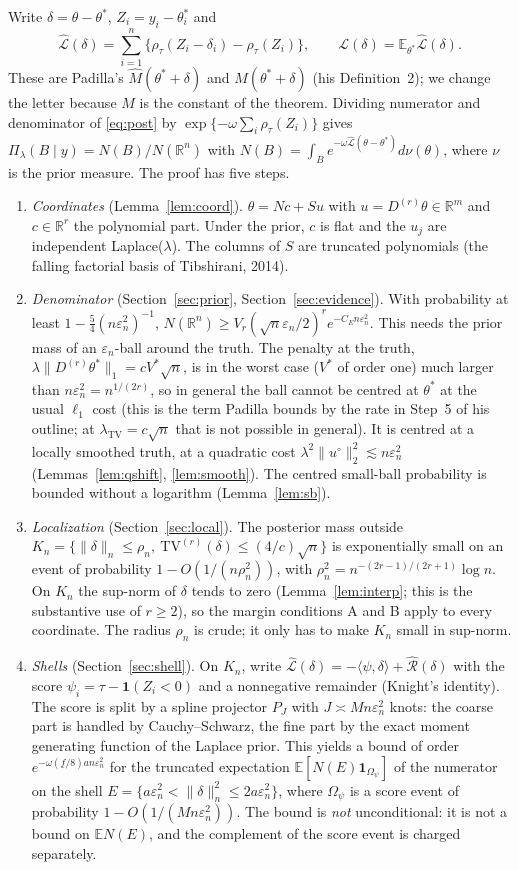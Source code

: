\documentclass[11pt]{article}
\theoremstyle{definition}
\theoremstyle{remark}
\newcommand{\R}{\mathbb{R}}
\newcommand{\E}{\mathbb{E}}
\newcommand{\TV}{\mathrm{TV}}
\newcommand{\Dr}{D^{(r)}}
\newcommand{\lamtv}{\lambda_{\TV}}
\newcommand{\thetas}{\theta^{*}}
\newcommand{\om}{\omega}
\newcommand{\en}{\varepsilon_n}
\newcommand{\Lh}{\widehat{\mathcal L}}
\newcommand{\Lm}{\mathcal L}
\newcommand{\Rh}{\widehat{\mathcal R}}
\newcommand{\fl}{\underline f}
\newcommand{\nn}[1]{\|#1\|_n}
\newcommand{\ind}{\mathbf 1}
\begin{document}
Write $\delta=\theta-\thetas$, $Z_i=y_i-\thetas_i$ and
\[
\Lh(\delta)=\sum_{i=1}^n\{\rho_\tau(Z_i-\delta_i)-\rho_\tau(Z_i)\},\qquad \Lm(\delta)=\E_{\thetas}\Lh(\delta).
\]
These are Padilla's $\hat M(\thetas+\delta)$ and $M(\thetas+\delta)$ (his Definition~2); we change the letter because $M$ is the constant of the theorem. Dividing numerator and denominator of \eqref{eq:post} by $\exp\{-\om\sum_i\rho_\tau(Z_i)\}$ gives $\Pi_\lambda(B\mid y)=N(B)/N(\R^n)$ with $N(B)=\int_Be^{-\om\Lh(\theta-\thetas)}d\nu(\theta)$, where $\nu$ is the prior measure. The proof has five steps.

\begin{enumerate}[itemsep=3pt,topsep=3pt,label=\textbf{Step \arabic*.},leftmargin=*]
\item \emph{Coordinates} (Lemma~\ref{lem:coord}). $\theta=Nc+Su$ with $u=\Dr\theta\in\R^m$ and $c\in\R^r$ the polynomial part. Under the prior, $c$ is flat and the $u_j$ are independent Laplace($\lambda$). The columns of $S$ are truncated polynomials (the falling factorial basis of Tibshirani, 2014).
\item \emph{Denominator} (Section~\ref{sec:prior}, Section~\ref{sec:evidence}). With probability at least $1-\tfrac54(n\en^2)^{-1}$,
$N(\R^n)\ge V_r(\sqrt n\en/2)^re^{-C_En\en^2}$. This needs the prior mass of an $\en$-ball around the truth. The penalty at the truth, $\lambda\|\Dr\thetas\|_1=cV^{*}\sqrt n$, is in the worst case ($V^{*}$ of order one) much larger than $n\en^2=n^{1/(2r)}$, so in general the ball cannot be centred at $\thetas$ at the usual $\ell_1$ cost (this is the term Padilla bounds by the rate in Step~5 of his outline; at $\lamtv=c\sqrt n$ that is not possible in general). It is centred at a locally smoothed truth, at a quadratic cost $\lambda^2\|u^\circ\|_2^2\lesssim n\en^2$ (Lemmas~\ref{lem:qshift}, \ref{lem:smooth}). The centred small-ball probability is bounded without a logarithm (Lemma~\ref{lem:sb}).
\item \emph{Localization} (Section~\ref{sec:local}). The posterior mass outside $K_n=\{\nn{\delta}\le\rho_n,\ \TV^{(r)}(\delta)\le(4/c)\sqrt n\}$ is exponentially small on an event of probability $1-O(1/(n\rho_n^2))$, with $\rho_n^2=n^{-(2r-1)/(2r+1)}\log n$. On $K_n$ the sup-norm of $\delta$ tends to zero (Lemma~\ref{lem:interp}; this is the substantive use of $r\ge2$), so the margin conditions A and B apply to every coordinate. The radius $\rho_n$ is crude; it only has to make $K_n$ small in sup-norm.
\item \emph{Shells} (Section~\ref{sec:shell}). On $K_n$, write $\Lh(\delta)=-\langle\psi,\delta\rangle+\Rh(\delta)$ with the score $\psi_i=\tau-\ind(Z_i<0)$ and a nonnegative remainder (Knight's identity). The score is split by a spline projector $P_J$ with $J\asymp Mn\en^2$ knots: the coarse part is handled by Cauchy--Schwarz, the fine part by the exact moment generating function of the Laplace prior. This yields a bound of order $e^{-\om(\fl/8)an\en^2}$ for the truncated expectation $\E[N(E)\ind_{\Omega_\psi}]$ of the numerator on the shell $E=\{a\en^2<\nn{\delta}^2\le2a\en^2\}$, where $\Omega_\psi$ is a score event of probability $1-O(1/(Mn\en^2))$. The bound is \emph{not} unconditional: it is not a bound on $\E N(E)$, and the complement of the score event is charged separately.

\end{enumerate}
\end{document}
